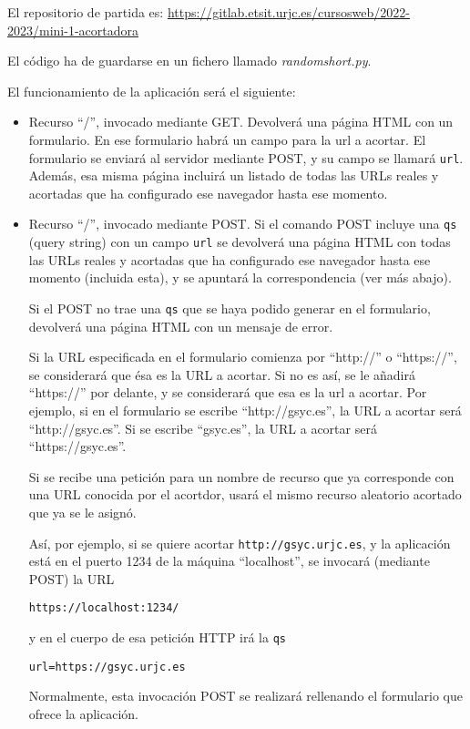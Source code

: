 El repositorio de partida es: \url{https://gitlab.etsit.urjc.es/cursosweb/2022-2023/mini-1-acortadora}

El código ha de guardarse en un fichero llamado \emph{randomshort.py}.

El funcionamiento de la aplicación será el siguiente:

\begin{itemize}
\item Recurso ``/'', invocado mediante GET. Devolverá una página HTML con un formulario. En ese formulario habrá un campo para la url a acortar. El formulario se enviará al servidor mediante POST, y su campo se llamará \texttt{url}. Además, esa misma página incluirá un listado de todas las URLs reales y acortadas que ha configurado ese navegador hasta ese momento.

\item Recurso ``/'', invocado mediante POST. Si el comando POST incluye una \texttt{qs} (query string) con un campo \texttt{url} se devolverá una página HTML con todas las URLs reales y acortadas que ha configurado ese navegador hasta ese momento (incluida esta), y se apuntará la correspondencia (ver más abajo).

Si el POST no trae una \texttt{qs} que se haya podido generar en el formulario, devolverá una página HTML con un mensaje de error.

Si la URL especificada en el formulario comienza por ``http://'' o ``https://'', se considerará que ésa es la URL a acortar. Si no es así, se le añadirá ``https://'' por delante, y se considerará que esa es la url a acortar. Por ejemplo, si en el formulario se escribe ``http://gsyc.es'', la URL a acortar será ``http://gsyc.es''. Si se escribe ``gsyc.es'', la URL a acortar será ``https://gsyc.es''.

Si se recibe una petición para un nombre de recurso que ya corresponde con una URL conocida por el acortdor, usará el mismo recurso aleatorio acortado que ya se le asignó.

Así, por ejemplo, si se quiere acortar \texttt{http://gsyc.urjc.es}, y la aplicación está en el puerto 1234 de la máquina ``localhost'', se invocará (mediante POST) la URL

\texttt{https://localhost:1234/}

y en el cuerpo de esa petición HTTP irá la \texttt{qs}

\verb|url=https://gsyc.urjc.es|

Normalmente, esta invocación POST se realizará rellenando el formulario que ofrece la aplicación.


\end{itemize}
